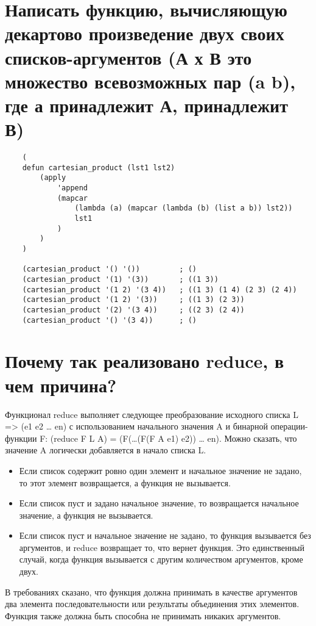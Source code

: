 \section{Написать функцию, вычисляющую декартово произведение двух своих списков-аргументов (А х В это множество всевозможных пар (a b), где а принадлежит А, принадлежит В)}

\begin{lstlisting}
    (
    defun cartesian_product (lst1 lst2)
        (apply
            'append
            (mapcar 
                (lambda (a) (mapcar (lambda (b) (list a b)) lst2)) 
                lst1
            )
        )
    )
    
    (cartesian_product '() '())         ; ()
    (cartesian_product '(1) '(3))       ; ((1 3)) 
    (cartesian_product '(1 2) '(3 4))   ; ((1 3) (1 4) (2 3) (2 4)) 
    (cartesian_product '(1 2) '(3))     ; ((1 3) (2 3)) 
    (cartesian_product '(2) '(3 4))     ; ((2 3) (2 4))  
    (cartesian_product '() '(3 4))      ; ()
\end{lstlisting}

\section{Почему так реализовано reduce, в чем причина?}

Функционал reduce выполняет следующее преобразование исходного списка L => (e1 e2 … en) с использованием начального значения A и бинарной операции-функции F: (reduce F L A) = (F(…(F(F A e1) e2)) … en). Можно сказать, что значение A логически добавляется в начало списка L.
  
\begin{itemize}
	\item Если список содержит ровно один элемент и начальное значение не задано, то этот элемент возвращается, а функция не вызывается. 
	\item Если список пуст и задано начальное значение, то возвращается начальное значение, а функция не вызывается. 
	\item Если список пуст и начальное значение не задано, то функция вызывается без аргументов, и reduce возвращает то, что вернет функция. Это единственный случай, когда функция вызывается с другим количеством аргументов, кроме двух.
\end{itemize}

В требованиях сказано, что функция должна принимать в качестве аргументов два элемента последовательности или результаты объединения этих элементов. Функция также должна быть способна не принимать никаких аргументов.

